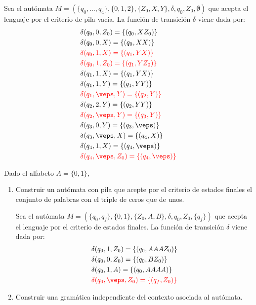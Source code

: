 \begin{ejercicio}
\begin{itemize}
        Sea el autómata $M = (\{q_0,\ldots,q_4\},\{0,1,2\},\{Z_0,X,Y\},\delta,q_0,Z_0,\emptyset)$ que acepta el lenguaje por el criterio de pila vacía. La función de transición $\delta$ viene dada por:
        \begin{align*}
            &\delta(q_0,0,Z_0) = \{(q_0,XZ_0)\} \\
            &\delta(q_0,0,X) = \{(q_0,XX)\} \\
            &\red{\delta(q_0,1,X) = \{(q_1,YX)\}} \\
            &\red{\delta(q_0,1,Z_0) = \{(q_1,YZ_0)\}} \\
            &\delta(q_1,1,X) = \{(q_1,YX)\} \\
            &\delta(q_1,1,Y) = \{(q_1,YY)\} \\
            &\red{\delta(q_1,\veps,Y) = \{(q_2,Y)\}} \\
            &\delta(q_2,2,Y) = \{(q_2,YY)\} \\
            &\red{\delta(q_2,\veps,Y) = \{(q_3,Y)\}} \\
            &\delta(q_3,0,Y) = \{(q_3,\veps)\} \\
            &\delta(q_3,\veps,X) = \{(q_4,X)\} \\
            &\delta(q_4,1,X) = \{(q_4,\veps)\} \\
            &\red{\delta(q_4,\veps,Z_0) = \{(q_4,\veps)\}}
        \end{align*}

    \end{itemize}
\end{ejercicio}

\begin{ejercicio}\label{ej:1.5.17}
    Dado el alfabeto $A = \{0,1\}$,
    \begin{enumerate}
        \item Construir un autómata con pila que acepte por el criterio de estados finales el conjunto de palabras con el triple de ceros que de unos.
        
        Sea el autómata $M = (\{q_0,q_f\},\{0,1\},\{Z_0,A,B\},\delta,q_0,Z_0,\{q_f\})$ que acepta el lenguaje por el criterio de estados finales. La función de transición $\delta$ viene dada por:
        \begin{align*}
            &\delta(q_0,1,Z_0) = \{(q_0,AAAZ_0)\} \\
            &\delta(q_0,0,Z_0) = \{(q_0,BZ_0)\} \\
            &\delta(q_0,1,A) = \{(q_0,AAAA)\} \\
            &\red{\delta(q_0,\veps,Z_0) = \{(q_f,Z_0)\}} \\
        \end{align*}
        \item Construir una gramática independiente del contexto asociada al autómata.
    \end{enumerate}
\end{ejercicio}

